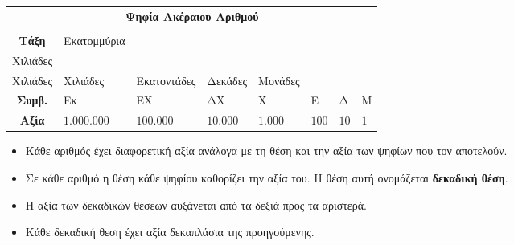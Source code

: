 \documentclass[twoside,11pt,a4paper,openany]{book}
\begin{document}
\begin{center}
\begin{longtable}{c|>{\centering\arraybackslash}m{1.5cm}|>{\centering\arraybackslash}m{1.5cm}|>{\centering\arraybackslash}m{1.2cm}|>{\centering\arraybackslash}m{1cm}|>{\centering\arraybackslash}m{1.5cm}|>{\centering\arraybackslash}m{1cm}|>{\centering\arraybackslash}m{1cm}}
\hline  \multicolumn{8}{c}{\textbf{Ψηφία Ακέραιου Αριθμού}} \rule[-2ex]{0pt}{5.5ex}\\ 
\hhline{========} \rule[-2ex]{0pt}{6ex} \begin{minipage}{1.5cm}
\begin{center}
{\footnotesize \textbf{Δεκαδική}}\\{\footnotesize \textbf{Τάξη}}
\end{center}
\end{minipage} &
{\footnotesize Εκατομμύρια} & 
\begin{minipage}{1.5cm}
\begin{center}
\vspace{-1.4mm}
{\footnotesize Εκατοντάδες}\\{\footnotesize Χιλιάδες}
\end{center}
\end{minipage} & 
\begin{minipage}{1.3cm}
\begin{center}
{\footnotesize Δεκάδες}\\{\footnotesize Χιλιάδες}
\end{center}
\end{minipage} & 
{\footnotesize Χιλιάδες}& 
{\footnotesize Εκατοντάδες} & 
{\footnotesize Δεκάδες}& 
{\footnotesize Μονάδες}  \\ 
\hline \rule[-1.5ex]{0pt}{4.5ex} {\footnotesize \textbf{Συμβ.}} & {\footnotesize Εκ} & {\footnotesize ΕΧ} & {\footnotesize ΔΧ} & {\footnotesize Χ} & {\footnotesize Ε} & {\footnotesize Δ} & {\footnotesize Μ} \\ 
\hline \rule[-1.5ex]{0pt}{4.5ex} {\footnotesize \textbf{Αξία}} & {\footnotesize $ 1.000.000 $} & {\footnotesize $ 100.000 $} & {\footnotesize $ 10.000 $} & {\footnotesize $ 1.000 $} & {\footnotesize $ 100 $} & {\footnotesize $ 10 $} & {\footnotesize $ 1 $}\\
\hline 
\end{longtable}
\end{center}
\begin{itemize}[itemsep=0mm]
\item Κάθε αριθμός έχει διαφορετική αξία ανάλογα με τη θέση και την αξία των ψηφίων που τον αποτελούν.
\item Σε κάθε αριθμό η θέση κάθε ψηφίου καθορίζει την αξία του. Η θέση αυτή ονομάζεται \textbf{δεκαδική θέση}.
\item Η αξία των δεκαδικών θέσεων αυξάνεται από τα δεξιά προς τα αριστερά.
\item Κάθε δεκαδική θεση έχει αξία δεκαπλάσια της προηγούμενης.
\end{itemize}
\end{document}

